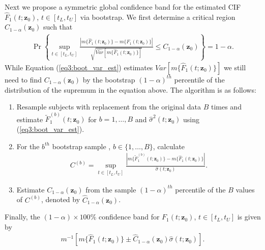 Next we propose a symmetric global confidence band for the estimated CIF $\hat{F}_1(t; \mathbf{z}_0)$, $t \in [t_L, t_U]$ via bootstrap. We first determine a critical region $C_{1 - \alpha}(\mathbf{z}_0)$ such that 
\begin{align}
\Pr \left\{ \sup_{t \in [t_L, t_U]}  \frac{| m\{\hat{F}_1(t; \mathbf{z}_0)\} - m\{F_1(t; \mathbf{z}_0)\} |}{\sqrt{\widehat{Var}[m\{\hat{F}_1(t; \mathbf{z}_0)\}]}} \leq C_{1 - \alpha}(\mathbf{z}_0) \right\} = 1 - \alpha. 
\end{align}
While Equation (\ref{eq3:boot_var_est}) estimates $\widehat{Var}[m\{\hat{F}_1(t; \mathbf{z}_0)\}]$ we still need to find $C_{1 - \alpha}(\mathbf{z}_0)$ by the bootstrap $(1-\alpha)^{th}$ percentile of the distribution of the supremum in the equation above.  The algorithm is as follows:
\begin{enumerate}
\item Resample subjects with replacement from the original data $B$ times and estimate $\tilde{F}^{(b)}_1(t; \mathbf{z}_0)$ for $b = 1, \ldots, B$ and $\hat{\sigma}^2(t; \mathbf{z}_0)$ using (\ref{eq3:boot_var_est}).
\item For the $b^{th}$ bootstrap sample , $b \in \{1, \ldots, B\}$, calculate
\begin{align*}
C^{(b)} = \sup_{t \in [t_L, t_U]}  \frac{| m\{\tilde{F}^{(b)}_1(t; \mathbf{z}_0)\} - m\{\hat{F}_1(t; \mathbf{z}_0)\} |}{\hat{\sigma}(t; \mathbf{z}_0)}. 
\end{align*}
\item Estimate $C_{1 - \alpha}(\mathbf{z}_0)$ from the sample $(1 - \alpha)^{th}$ percentile of the $B$ values of $C^{(b)}$, denoted by $\hat{C}_{1 - \alpha}(\mathbf{z}_0)$.
\end{enumerate}

Finally, the $(1 - \alpha) \times 100\%$ confidence band for $F_{1}(t; \mathbf{z}_0)$, $t \in [t_L, t_U]$ is given by 
\begin{align}
\label{eq3:boot_cif_band}
m^{-1} \left[ m\{\hat{F}_1(t; \mathbf{z}_0)\} \pm \hat{C}_{1 - \alpha }(\mathbf{z}_0) \hat{\sigma}(t; \mathbf{z}_0)\right].
\end{align}

